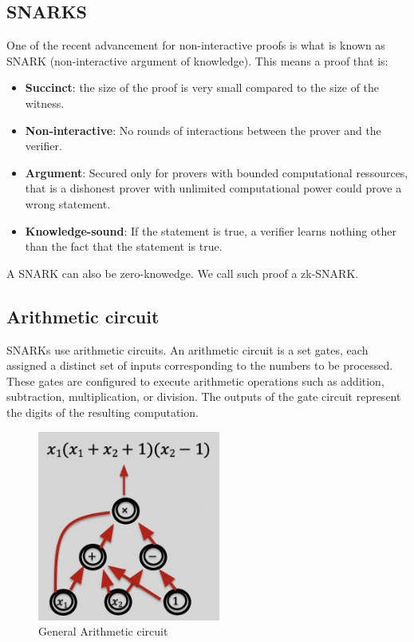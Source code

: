 \subsection{SNARKS} 
One of the recent advancement for non-interactive proofs is what is known as SNARK (non-interactive argument of knowledge).
This means a proof that is:
\begin{itemize}

    \item \textbf{Succinct}: the size of the proof is very small compared to the size of the witness.
    
    \item \textbf{Non-interactive}: No rounds of interactions between the prover and the verifier.

    \item \textbf{Argument}: Secured only for provers with bounded computational ressources, that is a dishonest prover with unlimited computational power could prove a wrong statement.

    \item \textbf{Knowledge-sound}: If the statement is true,  a verifier learns nothing other than the fact that the statement is true. \cite{NZ20}
    
    \end{itemize}

A SNARK can also be zero-knowedge. We call such proof a zk-SNARK.

\subsection{Arithmetic circuit} 
SNARKs use arithmetic circuits. An arithmetic circuit is a set gates, each assigned a distinct set of inputs corresponding to the numbers to be processed. 
These gates are configured to execute arithmetic operations such as addition, subtraction, multiplication, or division. The outputs of the gate circuit represent the digits of the resulting computation.

\begin{figure}[H]
    \centering
    \includegraphics[width=60mm]{ArithmeticCircuit.png}
    \caption{General Arithmetic circuit \cite{ZKP23}}
    \label{overflow}
    \end{figure}

